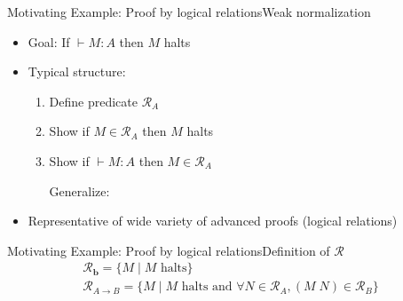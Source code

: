 \documentclass[usenames,dvipsnames]{beamer}
\newcommand{\const}[1]{\textbf{#1}}
\newcommand{\arrow}{\to}
\newcommand{\stepsto}{\longrightarrow}
\begin{document}
\begin{frame}[fragile]{Motivating Example: Proof by logical relations}{Weak normalization}
\begin{itemize}
\item Goal: If $\vdash M : A$ then $M$ halts
\item Typical structure:
\begin{enumerate}
\item Define predicate $\mathcal{R}_A$
\item Show if $M \in \mathcal{R}_A$ then $M$ halts
\item Show if $\vdash M : A$ then $M \in \mathcal{R}_A$
\pause

Generalize: 
\end{enumerate}
\pause \item Representative of wide variety of advanced proofs (logical relations)
\end{itemize}

\end{frame}

\begin{frame}{Motivating Example: Proof by logical relations}{Definition of $\mathcal{R}$}
\[
\begin{array}{l}
\mathcal{R}_{\const b} = \{M\; |\; M \text{ halts}\} \\
\mathcal{R}_{A \arrow B} = \{M\; |\; M \text{ halts and } \forall N
\in \mathcal{R}_A, (M\; N) \in \mathcal{R}_B \}
\end{array}
\]
\end{frame}
\end{document}

